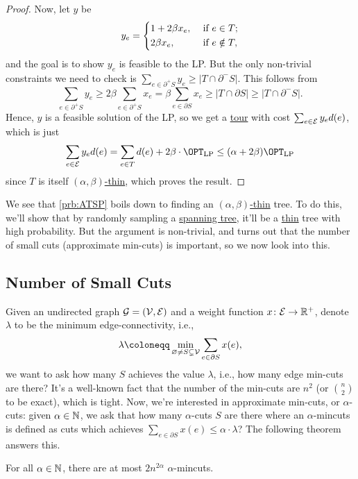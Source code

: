 \begin{proof}
	Now, let \(y\) be
	\[
		y_e = \begin{dcases}
			1 + 2\beta x_e, & \text{ if } e\in T ;    \\
			2\beta x_e,     & \text{ if } e \notin T,
		\end{dcases}
	\]
	and the goal is to show \(y_e\) is feasible to the LP. But the only non-trivial constraints we need to check is \(\sum_{e\in \partial ^+ S}y_e \geq \left\vert T \cap \partial ^- S \right\vert \). This follows from
	\[
		\sum_{e\in \partial ^+ S} y_e \geq 2\beta \sum_{e\in \partial ^+ S}x_e = \beta \sum_{e\in \partial S} x_e \geq \left\vert T \cap \partial S \right\vert \geq \left\vert T \cap \partial ^- S \right\vert.
	\]
	Hence, \(y\) is a feasible solution of the LP, so we get a \hyperref[def:tour]{tour} with cost \(\sum_{e\in \mathcal{\MakeUppercase{e}} }y_e d(e) \), which is just
	\[
		\sum_{e\in \mathcal{\MakeUppercase{e}} } y_e d(e) = \sum_{e\in T} d(e) + 2\beta \cdot \OPT_{\mathrm{LP} } \leq (\alpha + 2\beta )\OPT_{\mathrm{LP} }
	\]
	since \(T\) is itself \hyperref[def:thin]{\((\alpha , \beta )\)-thin}, which proves the result.
\end{proof}

We see that \autoref{prb:ATSP} boils down to finding an \hyperref[def:thin]{\((\alpha , \beta )\)-thin} tree. To do this, we'll show that by randomly sampling a \hyperref[def:spanning-tree]{spanning tree}, it'll be a \hyperref[def:thin]{thin} tree with high probability. But the argument is non-trivial, and turns out that the number of small cuts (approximate min-cuts) is important, so we now look into this.

\subsection{Number of Small Cuts}
Given an undirected graph \(\mathcal{\MakeUppercase{g}} =(\mathcal{\MakeUppercase{v}} , \mathcal{\MakeUppercase{e}} )\) and a weight function \(x\colon \mathcal{\MakeUppercase{e}} \to \mathbb{\MakeUppercase{r}} ^+\), denote \(\lambda \) to be the minimum edge-connectivity, i.e.,
\[
	\lambda \coloneqq \min _{\varnothing \neq S \subsetneq \mathcal{\MakeUppercase{v}} } \sum_{e\in \partial S} x(e),
\]
we want to ask how many \(S\) achieves the value \(\lambda \), i.e., how many edge min-cuts are there? It's a well-known fact that the number of the min-cuts are \(n^2\) (or \(\binom{n}{2}\) to be exact), which is tight. Now, we're interested in approximate min-cuts, or \(\alpha\)-cuts: given \(\alpha \in \mathbb{\MakeUppercase{n}} \), we ask that how many \(\alpha \)-cuts \(S\) are there where an \(\alpha \)-mincuts is defined as cuts which achieves \(\sum_{e\in \partial S} x(e) \leq \alpha \cdot \lambda \)? The following theorem answers this.

\begin{theorem}\label{thm:num-small-mincuts}
	For all \(\alpha \in \mathbb{\MakeUppercase{n}} \), there are at most \(2n^{2\alpha }\) \(\alpha\)-mincuts.
\end{theorem}